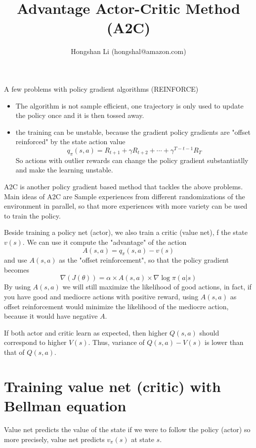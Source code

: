 \documentclass{article}
\title{Advantage Actor-Critic Method (A2C)}
\author{Hongshan Li (hongshal@amazon.com)}
\begin{document}
\maketitle

A few problems with policy gradient algorithms (REINFORCE)
\begin{itemize}
    \item The algorithm is not sample efficient, one trajectory
        is only used to update the policy once and it is then
        tossed away.
    \item the training can be unstable, because the gradient 
        policy gradients are "offset reinforced" by the
        state action value 
        \[
            q_{\pi}(s, a) = R_{t+1} + \gamma R_{t+2} + \cdots + 
                \gamma^{T-t-1}R_T
        \]
        So actions with outlier rewards can change the policy gradient
        substantiatlly and make the learning unstable. 
\end{itemize}

    
A2C is another policy gradient based method that tackles the above problems. 
Main ideas of A2C are
Sample experiences from different randomizations of the environment 
in parallel, so that more experiences with more variety can be used 
to train the policy. 

Beside training a policy net (actor), we also train a critic (value net),
f the state $v(s)$. We can use it compute the 
"advantage" of the action
\[
  A(s, a) = q_{\pi}(s, a) - v(s)
\]
and use $A(s, a)$ as the "offset reinforcement", so that the policy gradient 
becomes
\[
  \nabla(J(\theta)) = \alpha \times A(s, a) \times \nabla\log\pi(a|s)
\]
By using $A(s, a)$ we will still maximize the likelihood of good actions,
in fact, if you have good and mediocre actions with positive reward, 
using $A(s, a)$ as offset reinforcement would minimize the likelihood
of the mediocre action, because it would have negative $A$. 

If both actor and critic learn as expected, then higher $Q(s, a)$ 
should correspond to higher $V(s)$. Thus, variance of $Q(s, a) - V(s)$
is lower than that of $Q(s,a)$. 

\section{Training value net (critic) with Bellman equation}
Value net predicts the value of the state if we were to follow the policy (actor)
so more precisely, value net predicts $v_{\pi}(s)$ at state $s$. 
\end{document}
